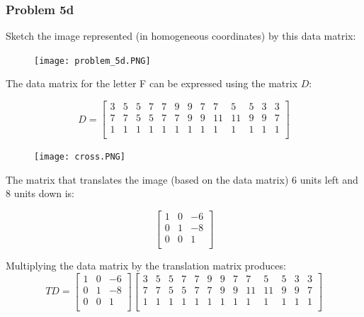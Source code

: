 \documentclass{article}
\begin{document}
\subsubsection*{Problem 5d}

Sketch the image represented (in homogeneous coordinates) by this data matrix:

\begin{figure}[H]
  \centering
  \texttt{[image: problem\_5d.PNG]}
  \label{fig3}
\end{figure}


The data matrix for the letter F can be expressed using the matrix $D$:

\[
  D =
  \left[ {\begin{array}{ccccccccccccc}
3 & 5 & 5 & 7 & 7 & 9 & 9 & 7 & 7 & 5 & 5 & 3 & 3 \\
7 & 7 & 5 & 5 & 7 & 7 & 9 & 9 & 11 & 11 & 9 & 9 & 7 \\
1 & 1 & 1 & 1 & 1 & 1 & 1 & 1 & 1 & 1 & 1 & 1 & 1 \\
  \end{array} } \right]
\]

\begin{figure}[H]
  \centering
  \texttt{[image: cross.PNG]}
  \label{fig3}
\end{figure}


The matrix that translates the image (based on the data matrix) 6 units left and 8 units down is:

\[
  \begin{bmatrix}
    1 & 0 & -6 \\
    0 & 1 & -8 \\
    0 & 0 & 1 \\
  \end{bmatrix}
\]

Multiplying the data matrix by the translation matrix produces:
\[
  TD =
  \begin{bmatrix}
    1 & 0 & -6 \\
    0 & 1 & -8 \\
    0 & 0 & 1 \\
  \end{bmatrix}
  \left[ {\begin{array}{ccccccccccccc}
3 & 5 & 5 & 7 & 7 & 9 & 9 & 7 & 7 & 5 & 5 & 3 & 3 \\
7 & 7 & 5 & 5 & 7 & 7 & 9 & 9 & 11 & 11 & 9 & 9 & 7 \\
1 & 1 & 1 & 1 & 1 & 1 & 1 & 1 & 1 & 1 & 1 & 1 & 1 \\
  \end{array} } \right]
\]
\end{document}
